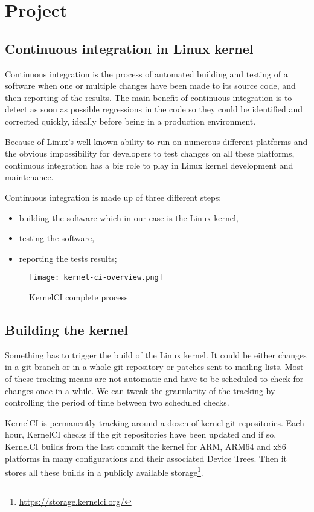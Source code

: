 \section{Project}
\subsection{Continuous integration in Linux kernel}

Continuous integration is the process of automated building and testing of a software when one or multiple changes have been made to its source code, and then reporting of the results. The main benefit of continuous integration is to detect as soon as possible regressions in the code so they could be identified and corrected quickly, ideally before being in a production environment.

Because of Linux's well-known ability to run on numerous different platforms and the obvious impossibility for developers to test changes on all these platforms, continuous integration has a big role to play in Linux kernel development and maintenance.

Continuous integration is made up of three different steps:
\begin{itemize}
  \item building the software which in our case is the Linux kernel,
  \item testing the software,
  \item reporting the tests results;
\end{itemize}

\begin{figure}[H]
  \texttt{[image: kernel-ci-overview.png]}
  \caption{KernelCI complete process}
\end{figure}

\subsection{Building the kernel}

Something has to trigger the build of the Linux kernel. It could be either changes in a git branch or in a whole git repository or patches sent to mailing lists. Most of these tracking means are not automatic and have to be scheduled to check for changes once in a while. We can tweak the granularity of the tracking by controlling the period of time between two scheduled checks.

KernelCI is permanently tracking around a dozen of kernel git repositories. Each hour, KernelCI checks if the git repositories have been updated and if so, KernelCI builds from the last commit the kernel for ARM, ARM64 and x86 platforms in many configurations and their associated Device Trees. Then it stores all these builds in a publicly available storage\footnote{\url{https://storage.kernelci.org/}}.

